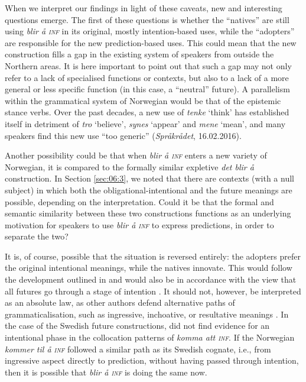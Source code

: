 \documentclass[output=paper,colorlinks,citecolor=brown]{langscibook}
\begin{document}
When we interpret our findings in light of these caveats, new and interesting questions emerge. The first of these questions is whether the “natives” are still using \textit{blir å \textsc{inf}} in its original, mostly intention-based uses, while the “adopters” are responsible for the new prediction-based uses. This could mean that the new construction fills a gap in the existing system of speakers from outside the Northern areas. It is here important to point out that such a gap may not only refer to a lack of specialised functions or contexts, but also to a lack of a more general or less specific function (in this case, a “neutral” future). A parallelism within the grammatical system of Norwegian would be that of the epistemic stance verbs. Over the past decades, a new use of \textit{tenke} ‘think’ has established itself in detriment of \textit{tro} ‘believe’, \textit{synes} ‘appear’ and \textit{mene} ‘mean’, and many speakers find this new use “too generic” (\textit{Språkrådet}, 16.02.2016).

Another possibility could be that when \textit{blir å \textsc{inf}} enters a new variety of Norwegian, it is compared to the formally similar expletive \textit{det blir å} construction. In Section \ref{sec:06:3}, we noted that there are contexts (with a null subject) in which both the obligational-intentional and the future meanings are possible, depending on the interpretation. Could it be that the formal and semantic similarity between these two constructions functions as an underlying motivation for speakers to use \textit{blir å \textsc{inf}} to express predictions, in order to separate the two?

It is, of course, possible that the situation is reversed entirely: the adopters prefer the original intentional meanings, while the natives innovate. This would follow the development outlined in \citet{vannebo1979} and would also be in accordance with the view that all futures go through a stage of intention \citep{BybeePerkinsPagliuca1994, Heine1995}. It should not, however, be interpreted as an absolute law, as other authors defend alternative paths of grammaticalisation, such as ingressive, inchoative, or resultative meanings \citep{Traugott1978, Dahl2000}. In the case of the Swedish future constructions, \citet{Hilpert2008} did not find evidence for an intentional phase in the collocation patterns of \textit{komma att \textsc{inf}}. If the Norwegian \textit{kommer til å \textsc{inf}} followed a similar path as its Swedish cognate, i.e., from ingressive aspect directly to prediction, without having passed through intention, then it is possible that \textit{blir å \textsc{inf}} is doing the same now.
\end{document}
